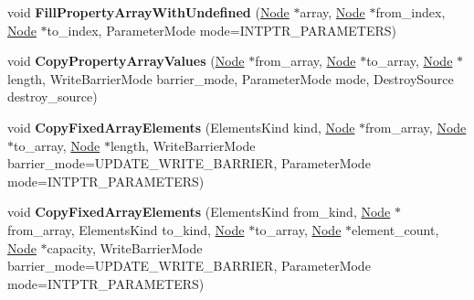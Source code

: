 \begin{DoxyCompactItemize}
void {\bfseries Fill\+Property\+Array\+With\+Undefined} (\mbox{\hyperlink{classv8_1_1internal_1_1compiler_1_1Node}{Node}} $\ast$array, \mbox{\hyperlink{classv8_1_1internal_1_1compiler_1_1Node}{Node}} $\ast$from\+\_\+index, \mbox{\hyperlink{classv8_1_1internal_1_1compiler_1_1Node}{Node}} $\ast$to\+\_\+index, Parameter\+Mode mode=I\+N\+T\+P\+T\+R\+\_\+\+P\+A\+R\+A\+M\+E\+T\+E\+RS)
\item 
\mbox{\label{classv8_1_1internal_1_1CodeStubAssembler_a24bc23287644e8a8a4bd96897b8b5769}} 
void {\bfseries Copy\+Property\+Array\+Values} (\mbox{\hyperlink{classv8_1_1internal_1_1compiler_1_1Node}{Node}} $\ast$from\+\_\+array, \mbox{\hyperlink{classv8_1_1internal_1_1compiler_1_1Node}{Node}} $\ast$to\+\_\+array, \mbox{\hyperlink{classv8_1_1internal_1_1compiler_1_1Node}{Node}} $\ast$length, Write\+Barrier\+Mode barrier\+\_\+mode, Parameter\+Mode mode, Destroy\+Source destroy\+\_\+source)
\item 
\mbox{\label{classv8_1_1internal_1_1CodeStubAssembler_a6dfad1f6ecc81befb3631840fc333598}} 
void {\bfseries Copy\+Fixed\+Array\+Elements} (Elements\+Kind kind, \mbox{\hyperlink{classv8_1_1internal_1_1compiler_1_1Node}{Node}} $\ast$from\+\_\+array, \mbox{\hyperlink{classv8_1_1internal_1_1compiler_1_1Node}{Node}} $\ast$to\+\_\+array, \mbox{\hyperlink{classv8_1_1internal_1_1compiler_1_1Node}{Node}} $\ast$length, Write\+Barrier\+Mode barrier\+\_\+mode=U\+P\+D\+A\+T\+E\+\_\+\+W\+R\+I\+T\+E\+\_\+\+B\+A\+R\+R\+I\+ER, Parameter\+Mode mode=I\+N\+T\+P\+T\+R\+\_\+\+P\+A\+R\+A\+M\+E\+T\+E\+RS)
\item 
\mbox{\label{classv8_1_1internal_1_1CodeStubAssembler_a7060bfe322a0bf05d7410d35dca675d2}} 
void {\bfseries Copy\+Fixed\+Array\+Elements} (Elements\+Kind from\+\_\+kind, \mbox{\hyperlink{classv8_1_1internal_1_1compiler_1_1Node}{Node}} $\ast$from\+\_\+array, Elements\+Kind to\+\_\+kind, \mbox{\hyperlink{classv8_1_1internal_1_1compiler_1_1Node}{Node}} $\ast$to\+\_\+array, \mbox{\hyperlink{classv8_1_1internal_1_1compiler_1_1Node}{Node}} $\ast$element\+\_\+count, \mbox{\hyperlink{classv8_1_1internal_1_1compiler_1_1Node}{Node}} $\ast$capacity, Write\+Barrier\+Mode barrier\+\_\+mode=U\+P\+D\+A\+T\+E\+\_\+\+W\+R\+I\+T\+E\+\_\+\+B\+A\+R\+R\+I\+ER, Parameter\+Mode mode=I\+N\+T\+P\+T\+R\+\_\+\+P\+A\+R\+A\+M\+E\+T\+E\+RS)
\item 

\end{DoxyCompactItemize}
